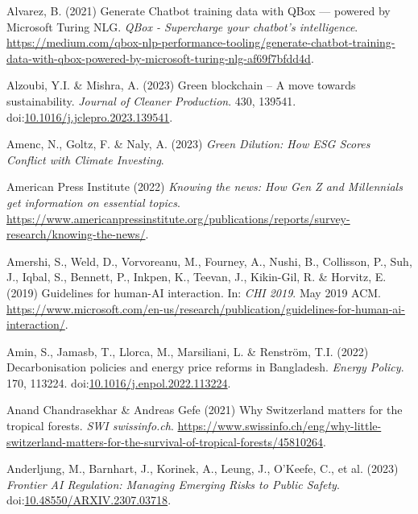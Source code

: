 \documentclass[
  letterpaper,
  DIV=11,
  numbers=noendperiod]{scrartcl}
\newlength{\cslhangindent}
\newenvironment{CSLReferences}[2] %
 {\begin{list}{}{%
  \setlength{\itemindent}{0pt}
  \setlength{\leftmargin}{0pt}
  \setlength{\parsep}{0pt}
  \ifodd #1
   \setlength{\leftmargin}{\cslhangindent}
   \setlength{\itemindent}{-1\cslhangindent}
  \fi
  \setlength{\itemsep}{#2\baselineskip}}}
 {\end{list}}
\begin{document}
\begin{CSLReferences}{0}{1}
Alvarez, B. (2021) Generate {Chatbot} training data with {QBox} ---
powered by {Microsoft Turing NLG}. \emph{QBox - Supercharge your
chatbot's intelligence}.
\url{https://medium.com/qbox-nlp-performance-tooling/generate-chatbot-training-data-with-qbox-powered-by-microsoft-turing-nlg-af69f7bfdd4d}.

Alzoubi, Y.I. \& Mishra, A. (2023) Green blockchain -- {A} move towards
sustainability. \emph{Journal of Cleaner Production}. 430, 139541.
doi:\href{https://doi.org/10.1016/j.jclepro.2023.139541}{10.1016/j.jclepro.2023.139541}.

Amenc, N., Goltz, F. \& Naly, A. (2023) \emph{Green {Dilution}: {How ESG
Scores Conflict} with {Climate Investing}}.

American Press Institute (2022) \emph{Knowing the news: {How Gen Z} and
{Millennials} get information on essential topics}.
\url{https://www.americanpressinstitute.org/publications/reports/survey-research/knowing-the-news/}.

Amershi, S., Weld, D., Vorvoreanu, M., Fourney, A., Nushi, B.,
Collisson, P., Suh, J., Iqbal, S., Bennett, P., Inkpen, K., Teevan, J.,
Kikin-Gil, R. \& Horvitz, E. (2019) Guidelines for human-{AI}
interaction. In: \emph{{CHI} 2019}. May 2019 ACM.
\url{https://www.microsoft.com/en-us/research/publication/guidelines-for-human-ai-interaction/}.

Amin, S., Jamasb, T., Llorca, M., Marsiliani, L. \& Renström, T.I.
(2022) Decarbonisation policies and energy price reforms in
{Bangladesh}. \emph{Energy Policy}. 170, 113224.
doi:\href{https://doi.org/10.1016/j.enpol.2022.113224}{10.1016/j.enpol.2022.113224}.

Anand Chandrasekhar \& Andreas Gefe (2021) Why {Switzerland} matters for
the tropical forests. \emph{SWI swissinfo.ch}.
\url{https://www.swissinfo.ch/eng/why-little-switzerland-matters-for-the-survival-of-tropical-forests/45810264}.

Anderljung, M., Barnhart, J., Korinek, A., Leung, J., O'Keefe, C., et
al. (2023) \emph{Frontier {AI Regulation}: {Managing Emerging Risks} to
{Public Safety}}.
doi:\href{https://doi.org/10.48550/ARXIV.2307.03718}{10.48550/ARXIV.2307.03718}.


\end{CSLReferences}
\end{document}
